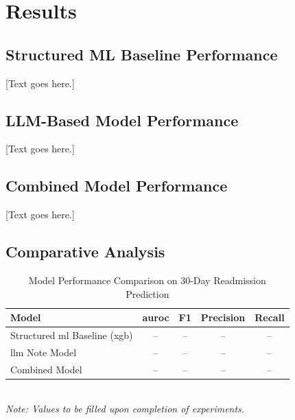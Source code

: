 \documentclass[12pt, a4paper]{article}
\begin{document}
\section{Results}

\subsection{Structured ML Baseline Performance}

[Text goes here.]

\subsection{LLM-Based Model Performance}

[Text goes here.]

\subsection{Combined Model Performance}

[Text goes here.]

\subsection{Comparative Analysis}

\begin{table}[H]
  \caption{Model Performance Comparison on 30-Day Readmission Prediction}
  \label{tab:results_comparison}
  \centering
  \singlespacing\small
  \begin{tabularx}{\textwidth}{X c c c c}
    \toprule
    \textbf{Model} & \textbf{\gls{auroc}} & \textbf{F1} & \textbf{Precision} & \textbf{Recall} \\
    \midrule
    Structured \gls{ml} Baseline (\gls{xgb}) & -- & -- & -- & -- \\
    \gls{llm} Note Model                      & -- & -- & -- & -- \\
    Combined Model                            & -- & -- & -- & -- \\
    \bottomrule
  \end{tabularx}
  \\[0.5em]
  \footnotesize\textit{Note: Values to be filled upon completion of experiments.}
\end{table}
\end{document}
